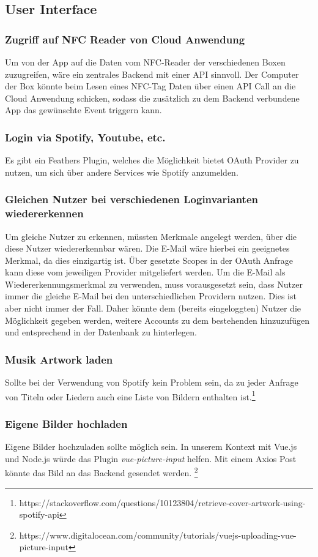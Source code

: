 \documentclass[10pt, a4paper, draft]{article}
\begin{document}
\subsection{User Interface}
\subsubsection{Zugriff auf NFC Reader von Cloud Anwendung}
Um von der App auf die Daten vom NFC-Reader der verschiedenen Boxen zuzugreifen, wäre ein zentrales Backend mit einer API sinnvoll.
Der Computer der Box könnte beim Lesen eines NFC-Tag Daten über einen API Call an die Cloud Anwendung schicken, sodass die zusätzlich zu dem Backend verbundene App das gewünschte Event triggern kann.

\subsubsection{Login via Spotify, Youtube, etc.}
Es gibt ein Feathers Plugin, welches die Möglichkeit bietet OAuth Provider zu nutzen, um sich über andere Services wie Spotify anzumelden.

\subsubsection{Gleichen Nutzer bei verschiedenen Loginvarianten wiedererkennen}
Um gleiche Nutzer zu erkennen, müssten Merkmale angelegt werden, über die diese Nutzer wiedererkennbar wären.
Die E-Mail wäre hierbei ein geeignetes Merkmal, da dies einzigartig ist. Über gesetzte Scopes in der OAuth Anfrage kann diese vom jeweiligen Provider mitgeliefert werden.
Um die E-Mail als Wiedererkennungsmerkmal zu verwenden, muss vorausgesetzt sein, dass Nutzer immer die gleiche E-Mail bei den unterschiedlichen Providern nutzen. Dies ist aber nicht immer der Fall.
Daher könnte dem (bereits eingeloggten) Nutzer die Möglichkeit gegeben werden, weitere Accounts zu dem bestehenden hinzuzufügen und entsprechend in der Datenbank zu hinterlegen.

\subsubsection{Musik Artwork laden}
Sollte bei der Verwendung von Spotify kein Problem sein, da zu jeder Anfrage von Titeln oder Liedern auch eine Liste von Bildern enthalten ist.\footnote{https://stackoverflow.com/questions/10123804/retrieve-cover-artwork-using-spotify-api}

\subsubsection{Eigene Bilder hochladen}
Eigene Bilder hochzuladen sollte möglich sein. In unserem Kontext mit Vue.js und Node.js würde das Plugin \textit{vue-picture-input} helfen.
Mit einem Axios Post könnte das Bild an das Backend gesendet werden. \footnote{https://www.digitalocean.com/community/tutorials/vuejs-uploading-vue-picture-input}
\end{document}
